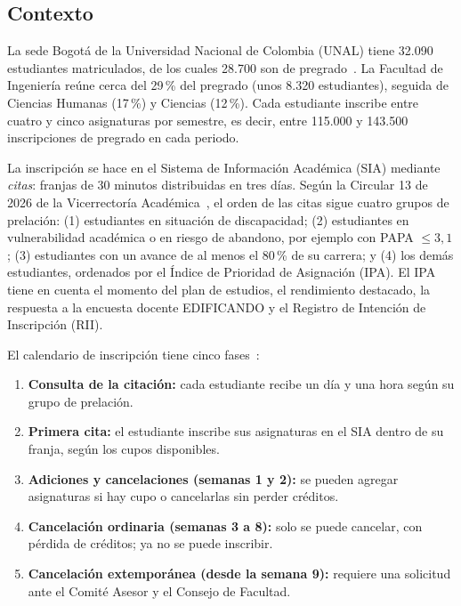 \documentclass[conference]{IEEEtran}
\begin{document}
\subsection{Contexto}
La sede Bogotá de la Universidad Nacional de Colombia (UNAL) tiene 32.090 estudiantes matriculados, de los cuales 28.700 son de pregrado~\cite{unal-cifras}. La Facultad de Ingeniería reúne cerca del 29\,\% del pregrado (unos 8.320 estudiantes), seguida de Ciencias Humanas (17\,\%) y Ciencias (12\,\%). Cada estudiante inscribe entre cuatro y cinco asignaturas por semestre, es decir, entre 115.000 y 143.500 inscripciones de pregrado en cada periodo.

La inscripción se hace en el Sistema de Información Académica (SIA) mediante \emph{citas}: franjas de 30 minutos distribuidas en tres días. Según la Circular 13 de 2026 de la Vicerrectoría Académica~\cite{circular13}, el orden de las citas sigue cuatro grupos de prelación: (1) estudiantes en situación de discapacidad; (2) estudiantes en vulnerabilidad académica o en riesgo de abandono, por ejemplo con PAPA $\leq 3{,}1$; (3) estudiantes con un avance de al menos el 80\,\% de su carrera; y (4) los demás estudiantes, ordenados por el Índice de Prioridad de Asignación (IPA). El IPA tiene en cuenta el momento del plan de estudios, el rendimiento destacado, la respuesta a la encuesta docente EDIFICANDO y el Registro de Intención de Inscripción (RII).

El calendario de inscripción tiene cinco fases~\cite{dninfoa}:
\begin{enumerate}
    \item \textbf{Consulta de la citación:} cada estudiante recibe un día y una hora según su grupo de prelación.
    \item \textbf{Primera cita:} el estudiante inscribe sus asignaturas en el SIA dentro de su franja, según los cupos disponibles.
    \item \textbf{Adiciones y cancelaciones (semanas 1 y 2):} se pueden agregar asignaturas si hay cupo o cancelarlas sin perder créditos.
    \item \textbf{Cancelación ordinaria (semanas 3 a 8):} solo se puede cancelar, con pérdida de créditos; ya no se puede inscribir.
    \item \textbf{Cancelación extemporánea (desde la semana 9):} requiere una solicitud ante el Comité Asesor y el Consejo de Facultad.
\end{enumerate}
\end{document}
